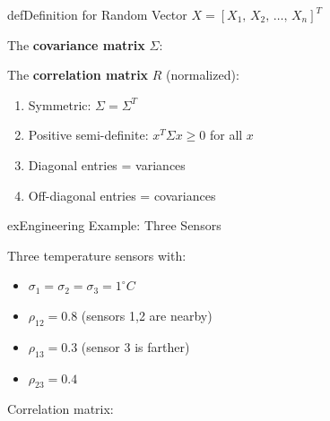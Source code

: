 
\begin{PSbox}[unbreakable]{def}{Definition for Random Vector $X = [X_{1},\, X_{2},\, \ldots,\, X_{n}]^{T}$}

The \textbf{covariance matrix} $\Sigma$:



The \textbf{correlation matrix} $R$ (normalized):


\end{PSbox}


\begin{enumerate}
\def\labelenumi{\arabic{enumi}.}
\tightlist
\item
  Symmetric: $\Sigma = \Sigma^{T}$
\item
  Positive semi-definite: $x^{T}\Sigma x \ge 0$ for all $x$
\item
  Diagonal entries = variances
\item
  Off-diagonal entries = covariances
\end{enumerate}

\begin{PSbox}[unbreakable]{ex}{Engineering Example: Three Sensors}

Three temperature sensors with:

\begin{itemize}
\tightlist
\item
  $\sigma_{1} = \sigma_{2} = \sigma_{3} = 1^{\circ}C$
\item
  $\rho_{12} = 0.8$ (sensors 1,2 are nearby)
\item
  $\rho_{13} = 0.3$ (sensor 3 is farther)
\item
  $\rho_{23} = 0.4$
\end{itemize}

Correlation matrix:

\end{PSbox}

